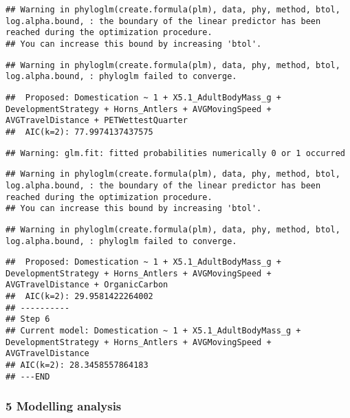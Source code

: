 \documentclass[
]{article}
\begin{document}
\begin{verbatim}
## Warning in phyloglm(create.formula(plm), data, phy, method, btol, log.alpha.bound, : the boundary of the linear predictor has been reached during the optimization procedure.
## You can increase this bound by increasing 'btol'.
\end{verbatim}

\begin{verbatim}
## Warning in phyloglm(create.formula(plm), data, phy, method, btol, log.alpha.bound, : phyloglm failed to converge.
\end{verbatim}

\begin{verbatim}
##  Proposed: Domestication ~ 1 + X5.1_AdultBodyMass_g + DevelopmentStrategy + Horns_Antlers + AVGMovingSpeed + AVGTravelDistance + PETWettestQuarter
##  AIC(k=2): 77.9974137437575
\end{verbatim}

\begin{verbatim}
## Warning: glm.fit: fitted probabilities numerically 0 or 1 occurred
\end{verbatim}

\begin{verbatim}
## Warning in phyloglm(create.formula(plm), data, phy, method, btol, log.alpha.bound, : the boundary of the linear predictor has been reached during the optimization procedure.
## You can increase this bound by increasing 'btol'.
\end{verbatim}

\begin{verbatim}
## Warning in phyloglm(create.formula(plm), data, phy, method, btol, log.alpha.bound, : phyloglm failed to converge.
\end{verbatim}

\begin{verbatim}
##  Proposed: Domestication ~ 1 + X5.1_AdultBodyMass_g + DevelopmentStrategy + Horns_Antlers + AVGMovingSpeed + AVGTravelDistance + OrganicCarbon
##  AIC(k=2): 29.9581422264002
## ----------
## Step 6
## Current model: Domestication ~ 1 + X5.1_AdultBodyMass_g + DevelopmentStrategy + Horns_Antlers + AVGMovingSpeed + AVGTravelDistance
## AIC(k=2): 28.3458557864183
## ---END
\end{verbatim}

\hypertarget{modelling-analysis}{%
\subsubsection{5 Modelling analysis}\label{modelling-analysis}}
\end{document}
